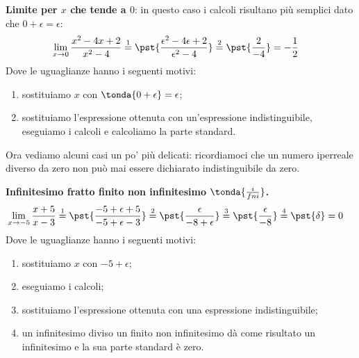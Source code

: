 \begin{esempio}
\textbf{Limite per \(x\) che tende a 
\(0\)}:
in questo caso i calcoli risultano più semplici dato che
\(0 + \epsilon = \epsilon\): 
\begin{align*}
\lim_{x \rightarrow 0} \frac{x^2-4x+2}{x^2-4} & \stackrel{1}{=} 
  \pst{\frac{\epsilon^2-4\epsilon+2}{\epsilon^2-4}} \stackrel{2}{=}  
  \pst{\frac{2}{-4}} = -\frac{1}{2}
\end{align*}
Dove le uguaglianze hanno i seguenti motivi:
\begin{enumerate} [nosep]
 \item sostituiamo \(x\) con \(\tonda{0+\epsilon}=\epsilon\);
 \item sostituiamo l'espressione ottenuta con un'espressione 
   indistinguibile, eseguiamo i calcoli e calcoliamo la parte standard.
\end{enumerate}
\end{esempio}

Ora vediamo alcuni casi un po' più delicati: ricordiamoci che un numero 
iperreale diverso da zero non può mai essere dichiarato indistinguibile 
da zero.

\begin{esempio}
\textbf{Infinitesimo fratto finito non infinitesimo 
\(\tonda{\frac{i}{fni}}\).}
\begin{align*}
\lim_{x \rightarrow -5} \frac{x+5}{x-3} & \stackrel{1}{=} 
  \pst{\frac{-5+\epsilon+5}{-5+\epsilon-3}} \stackrel{2}{=}  
  \pst{\frac{\epsilon}{-8+\epsilon}} \stackrel{3}{=} 
  \pst{\frac{\epsilon}{-8}} \stackrel{4}{=} \pst{\delta} = 0
\end{align*}
Dove le uguaglianze hanno i seguenti motivi:
\begin{enumerate} [nosep]
 \item sostituiamo \(x\) con \(-5+\epsilon\);
 \item eseguiamo i calcoli;
 \item sostituiamo l'espressione ottenuta con una espressione 
   indistinguibile;
 \item un infinitesimo diviso un finito non infinitesimo dà come risultato 
un infinitesimo e la sua parte standard è zero.
\end{enumerate}
\end{esempio}

